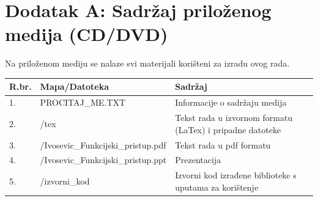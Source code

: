 \documentclass[times, utf8, zavrsni]{fer}
\begin{document}
\pagebreak
\section*{Dodatak A: Sadržaj priloženog medija (CD/DVD)}
Na priloženom mediju se nalaze svi materijali korišteni za izradu ovog rada. 


\begin{center}
    \begin{tabular}{ | l | l | p{9cm} |}
    \hline
    R.br. & Mapa/Datoteka & Sadržaj \\ \hline
    
    1. & PROCITAJ\_ME.TXT & Informacije o sadržaju medija \\ \hline
    
    2. & /tex & Tekst rada u izvornom formatu (LaTex) i pripadne datoteke \\ \hline
    
    3. & /Ivosevic\_Funkcijski\_pristup.pdf & Tekst rada u pdf formatu \\ \hline
    4. & /Ivosevic\_Funkcijski\_pristup.ppt & Prezentacija \\ \hline
    
    5. & /izvorni\_kod & Izvorni kod izrađene biblioteke s uputama za korištenje \\ \hline
    
    \end{tabular}
\end{center}
\end{document}
